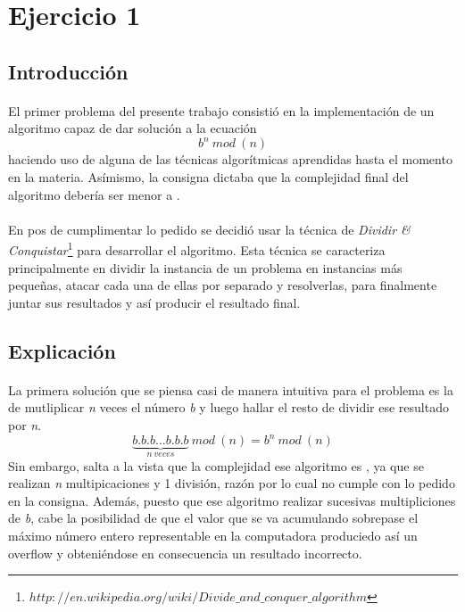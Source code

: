 \section{Ejercicio 1}

\subsection{Introducción}

\paragraph{}
El primer problema del presente trabajo consistió en la implementación de un algoritmo capaz de dar solución a la ecuación 
	\begin{equation} 
		b^n\ mod\ (n)
	\label{problema}
	\end{equation}
haciendo uso de alguna de las técnicas algorítmicas aprendidas hasta el momento en la materia. Asímismo, la consigna dictaba que la complejidad final del algoritmo debería ser menor a .

\paragraph{}
En pos de cumplimentar lo pedido se decidió usar la técnica de \textit{Dividir \& Conquistar}\footnote{$http://en.wikipedia.org/wiki/Divide\_and\_conquer\_algorithm$} para desarrollar el algoritmo. Esta técnica se caracteriza principalmente en dividir la instancia de un problema en instancias más pequeñas, atacar cada una de ellas por separado y resolverlas, para finalmente juntar sus resultados y así producir el resultado final.


\subsection{Explicación}

\paragraph{}
La primera solución que se piensa casi de manera intuitiva para el problema es la de mutliplicar \textit{n} veces el número \textit{b} y luego hallar el resto de dividir ese resultado por \textit{n}. 
	\begin{equation}
		\underbrace{b.b.b \hdots b.b.b}_{n\ veces}\ mod\ (n)  = b^n\ mod\ (n)
	\label{primera_idea}		
	\end{equation}
Sin embargo, salta a la vista que la complejidad ese algoritmo es , ya que se realizan \textit{n} multipicaciones y 1 división, razón por lo cual no cumple con lo pedido en la consigna. Además, puesto que ese algoritmo realizar sucesivas multipliciones de \textit{b}, cabe la posibilidad de que el valor que se va acumulando sobrepase el máximo número entero representable en la computadora produciedo así un overflow y obteniéndose en consecuencia un resultado incorrecto.

